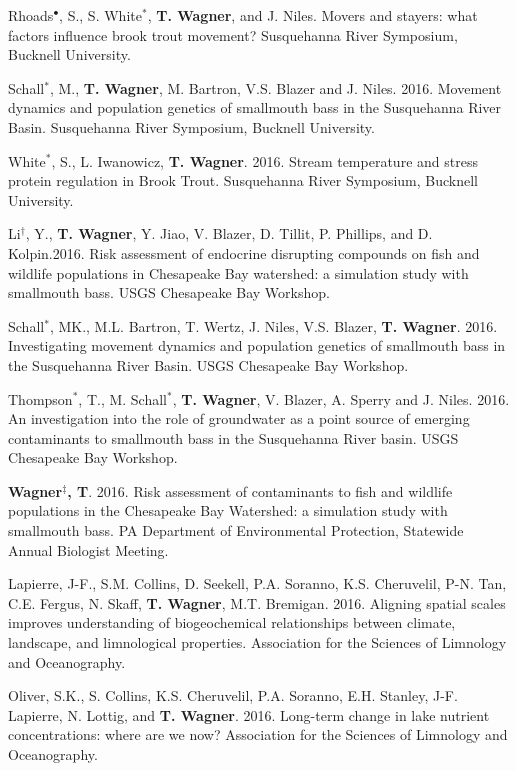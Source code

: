\documentclass[10pt]{article}
\begin{document}
\begin{flushleft}
\begin{etaremune}
\item Rhoads$^\bullet$, S., S. White$^*$, {\bf T. Wagner}, and J. Niles. Movers and stayers: what factors influence brook trout movement? Susquehanna River Symposium, Bucknell University.

\item Schall$^*$, M., {\bf T. Wagner}, M. Bartron, V.S. Blazer and J. Niles. 2016. Movement dynamics and population genetics of smallmouth bass in the Susquehanna River Basin. Susquehanna River Symposium, Bucknell University.

\item White$^*$, S., L. Iwanowicz, {\bf T. Wagner}. 2016. Stream temperature and stress protein regulation in Brook Trout. Susquehanna River Symposium, Bucknell University. 

\item Li$^\dagger$, Y.,  {\bf T. Wagner}, Y. Jiao, V. Blazer, D. Tillit, P. Phillips, and D. Kolpin.2016. Risk assessment of endocrine disrupting compounds on fish and wildlife populations in Chesapeake Bay watershed: a simulation study with smallmouth bass. USGS Chesapeake Bay Workshop.

\item Schall$^*$, MK., M.L. Bartron, T. Wertz, J. Niles, V.S. Blazer, {\bf T. Wagner}. 2016. Investigating movement dynamics and population genetics of smallmouth bass in the Susquehanna River Basin. USGS Chesapeake Bay Workshop.

Thompson$^*$, T., M. Schall$^*$, {\bf T. Wagner}, V. Blazer, A. Sperry and J. Niles. 2016. An investigation into the role of groundwater as a point source of emerging contaminants to smallmouth bass in the Susquehanna River basin. USGS Chesapeake Bay Workshop.

 \item {\bf Wagner$^\ddagger$, T}. 2016. Risk assessment of contaminants to fish and wildlife populations in the Chesapeake Bay Watershed: a simulation study with smallmouth bass. PA Department of Environmental Protection, Statewide Annual Biologist Meeting.

\item Lapierre, J-F., S.M. Collins, D. Seekell, P.A. Soranno, K.S. Cheruvelil, P-N. Tan, C.E. Fergus, N. Skaff,  {\bf T. Wagner}, M.T. Bremigan. 2016. Aligning spatial scales improves understanding of biogeochemical relationships between climate, landscape, and limnological properties. Association for the Sciences of Limnology and Oceanography.

\item Oliver, S.K., S. Collins, K.S. Cheruvelil, P.A. Soranno, E.H. Stanley, J-F. Lapierre, N. Lottig, and  {\bf T. Wagner}. 2016. Long-term change in lake nutrient concentrations: where are we now? Association for the Sciences of Limnology and Oceanography. 


\end{etaremune}
\end{flushleft}
\end{document}
